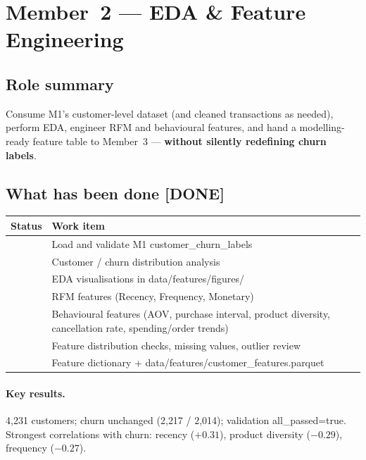 \documentclass[11pt,a4paper]{article}
\newcommand{\done}{[DONE]}
\renewcommand{\texttt}[1]{#1}
\begin{document}
\newpage
\section{Member~2 --- EDA \& Feature Engineering}
\label{sec:m2}

\subsection{Role summary}
Consume M1's customer-level dataset (and cleaned transactions as needed),
perform EDA, engineer RFM and behavioural features, and hand a modelling-ready
feature table to Member~3 --- \textbf{without silently redefining churn labels}.

\subsection{What has been done \done{}}
\begin{tabular}{|p{}|p{}|}
\hline
\textbf{Status} & \textbf{Work item} \\
\hline
\done{} & Load and validate M1 \texttt{customer\_churn\_labels} \\
\hline
\done{} & Customer / churn distribution analysis \\
\hline
\done{} & EDA visualisations in \texttt{data/features/figures/} \\
\hline
\done{} & RFM features (Recency, Frequency, Monetary) \\
\hline
\done{} & Behavioural features (AOV, purchase interval, product diversity, cancellation rate, spending/order trends) \\
\hline
\done{} & Feature distribution checks, missing values, outlier review \\
\hline
\done{} & Feature dictionary + \texttt{data/features/customer\_features.parquet} \\
\hline
\end{tabular}

\paragraph{Key results.}
4{,}231 customers; churn unchanged (2{,}217 / 2{,}014); validation
\texttt{all\_passed=true}. Strongest correlations with churn: recency
($+0.31$), product diversity ($-0.29$), frequency ($-0.27$).
\end{document}
